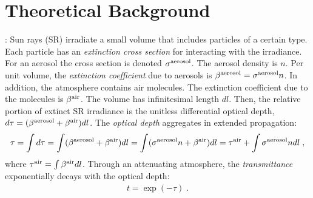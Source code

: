 \documentclass[10pt,letterpaper]{article}
\begin{document}

\section{Theoretical Background}
\label{sec:theor-backgr}

: Sun rays (SR) irradiate a small volume
that includes particles of a certain type.  Each particle has an {\em
  extinction cross section} for interacting with the irradiance. For
an aerosol the cross section is denoted $\sigma^{\rm aerosol}$.  The
aerosol density is $n$. Per unit volume, the {\em extinction
  coefficient} due to aerosols is $\beta^{\rm aerosol}= \sigma^{\rm
  aerosol} n$. In addition, the atmosphere contains air molecules.
The extinction coefficient due to the molecules is $\beta^{\rm air}$.
The volume has infinitesimal length $dl$. Then, the relative portion
of extinct SR irradiance is the unitless differential optical depth,
$d\tau= (\beta^{\rm aerosol}+\beta^{\rm air}) dl$.  The {\em optical
  depth} aggregates in extended propagation:
\begin{align}
  \tau= \int d\tau=\int (\beta^{\rm aerosol}+\beta^{\rm air}) dl =\int
  (\sigma^{\rm aerosol} n +\beta^{\rm air}) dl = \tau^{\rm air}+ \int
  \sigma^{\rm aerosol} n dl \;,
  \label{eq:tau}
\end{align}
where $\tau^{\rm air}=\int \beta^{\rm air} dl$.  Through an
attenuating atmosphere, the {\em transmittance} exponentially decays
with the optical depth:
\begin{align}
  t=\exp(-\tau) \;.
  \label{eq:beer-lambert}
\end{align}
\end{document}
